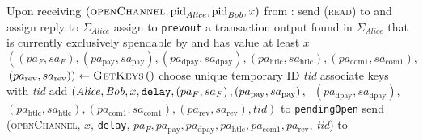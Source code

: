\begin{algorithmic}[1]
    \State Upon receiving $\left(\textsc{openChannel}, \mathrm{pid}_{\mathit{Alice}},
    \mathrm{pid}_{\mathit{Bob}}, x\right)$ from \environment:
    \Indent
      \State send (\textsc{read}) to \ledger{} and assign reply to
      $\Sigma_{\mathit{Alice}}$
      \State assign to \texttt{prevout} a transaction output found in
      $\Sigma_{\mathit{Alice}}$ that is currently exclusively spendable by
      \alice{} and has value at least $x$ 
      \State $\left(\left(pa_F, sa_F\right), \left(pa_{\mathrm{pay}},
      sa_{\mathrm{pay}}\right), \left(pa_{\mathrm{dpay}},
      sa_{\mathrm{dpay}}\right), \left(pa_{\mathrm{htlc}},
      sa_{\mathrm{htlc}}\right), \left(pa_{\mathrm{com}1},
      sa_{\mathrm{com}1}\right),\right.$ $\left.\left(pa_{\mathrm{rev}},
      sa_{\mathrm{rev}}\right)\right) \gets \textsc{GetKeys}\left(\right)$
      \State choose unique temporary ID \textit{tid} 
      \State associate keys with \textit{tid}
      \State add $\left(\mathit{Alice}, \mathit{Bob}, x, \mathtt{delay},
      \left(pa_F, sa_F\right), \left(pa_{\mathrm{pay}},
      sa_{\mathrm{pay}}\right), \right.$ $\left.\left(pa_{\mathrm{dpay}},
      sa_{\mathrm{dpay}}\right),\right.$ $\left.\left(pa_{\mathrm{htlc}},
      sa_{\mathrm{htlc}}\right), \left(pa_{\mathrm{com}1},
      sa_{\mathrm{com}1}\right), \left(pa_{\mathrm{rev}},
      sa_{\mathrm{rev}}\right), \mathit{tid}\right)$ to \texttt{pendingOpen}
      \State send (\textsc{openChannel}, $x$, \texttt{delay}, $pa_F,
      pa_{\mathrm{pay}}, pa_{\mathrm{dpay}}, pa_{\mathrm{htlc}},
      pa_{\mathrm{com}1}, pa_{\mathrm{rev}}$, \textit{tid}) to \bob
    \EndIndent
    \State

    \EndIndent
    \State


\end{algorithmic}
